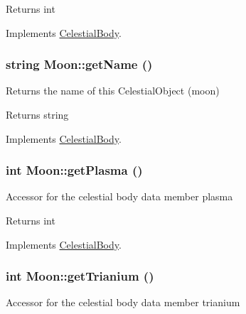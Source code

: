 \begin{DoxyReturn}{Returns}
int 
\end{DoxyReturn}


Implements \hyperlink{classCelestialBody}{CelestialBody}.

\hypertarget{classMoon_a7015a95bbb104f0fc3b46ece7a427655}{
\subsubsection[{getName}]{\setlength{\rightskip}{0pt plus 5cm}string Moon::getName ()}}
\label{d8/d6f/classMoon_a7015a95bbb104f0fc3b46ece7a427655}
Returns the name of this CelestialObject (moon)

\begin{DoxyReturn}{Returns}
string 
\end{DoxyReturn}


Implements \hyperlink{classCelestialBody}{CelestialBody}.

\hypertarget{classMoon_acc0fef605a7fd18d16aff7e827e9bf9a}{
\subsubsection[{getPlasma}]{\setlength{\rightskip}{0pt plus 5cm}int Moon::getPlasma ()}}
\label{d8/d6f/classMoon_acc0fef605a7fd18d16aff7e827e9bf9a}
Accessor for the celestial body data member plasma

\begin{DoxyReturn}{Returns}
int 
\end{DoxyReturn}


Implements \hyperlink{classCelestialBody}{CelestialBody}.

\hypertarget{classMoon_afa9d20396dcd4a5501fe1ee9c0a23397}{
\subsubsection[{getTrianium}]{\setlength{\rightskip}{0pt plus 5cm}int Moon::getTrianium ()}}
\label{d8/d6f/classMoon_afa9d20396dcd4a5501fe1ee9c0a23397}
Accessor for the celestial body data member trianium

